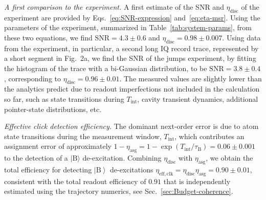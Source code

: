 \documentclass[
						superscriptaddress, 																 amsmath, amssymb,
		 aps,  prb,  
										floatfix,
		linenumbers,
			]{revtex4-1}
\newcommand{\ket}[1]{\left|#1\right>}
\begin{document}
\emph{A first comparison to the experiment. }A first estimate of the
SNR and $\eta_{\mathrm{disc}}$ of the experiment are provided by
Eqs.~\eqref{eq:SNR-expression} and~\eqref{eq:eta-msr}. Using the
parameters of the experiment, summarized in Table~\ref{tab:system-params},
from these two equations, we find $\mathrm{SNR}=4.3\pm0.6$ and $\eta_{\mathrm{disc}}=0.98\pm0.007$.
Using data from the experiment, in particular, a second long IQ record
trace, represented by a short segment in Fig.~2a, we find the SNR
of the jumps experiment, by fitting the histogram of the trace with
a bi-Gaussian distribution, to be $\mathrm{SNR}=3.8\pm0.4$, corresponding
to $\eta_{\mathrm{\mathrm{disc}}}=0.96\pm0.01$. The measured values
are slightly lower than the analytics predict due to readout imperfections
not included in the calculation so far, such as state transitions
during $T_{\mathrm{int}}$, cavity transient dynamics, additional
pointer-state distributions, etc.

\emph{Effective click detection efficiency. }The dominant next-order
error is due to atom state transitions during the measurement window,
$T_{\mathrm{int}}$, which contributes an assignment error of approximately
$1-\eta_{\mathrm{asg}}=1-\exp\left(T_{\mathrm{int}}/\tau_{\mathrm{B}}\right)=0.06\pm0.001$
to the detection of a $|\mathrm{B}\rangle$ de-excitation. Combining
$\eta_{\mathrm{disc}}$ with $\eta_{\mathrm{asg}}$, we obtain the
total efficiency for detecting $\ket{\mathrm{B}}$ de-excitations
$\eta_{\mathrm{eff,clk}}=\eta_{\mathrm{disc}}\eta_{\mathrm{asg}}=0.90\pm0.01$,
consistent with the total readout efficiency of $0.91$ that is independently
estimated using the trajectory numerics, see Sec.~\ref{sec:Budget-coherence}.





























\nocite{apsrev41Control}


\end{document}
